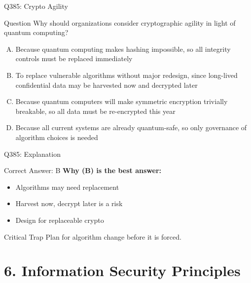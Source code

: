 \documentclass{beamer}
\begin{document}
	\begin{frame}{Q385: Crypto Agility}
		\begin{block}{Question}
			\small Why should organizations consider cryptographic agility in light of quantum computing?
		\end{block}
		\begin{enumerate}[(A)]
			\footnotesize
			\item Because quantum computing makes hashing impossible, so all integrity controls must be replaced immediately
			\item To replace vulnerable algorithms without major redesign, since long-lived confidential data may be harvested now and decrypted later
			\item Because quantum computers will make symmetric encryption trivially breakable, so all data must be re-encrypted this year
			\item Because all current systems are already quantum-safe, so only governance of algorithm choices is needed
		\end{enumerate}
	\end{frame}
	
	\begin{frame}{Q385: Explanation}
		\begin{block}{Correct Answer: B}
			\textbf{Why (B) is the best answer:}
			\begin{itemize}
				\item Algorithms may need replacement
				\item Harvest now, decrypt later is a risk
				\item Design for replaceable crypto
			\end{itemize}
		\end{block}
		\begin{alertblock}{Critical Trap}
			Plan for algorithm change before it is forced.
		\end{alertblock}
	\end{frame}
		
	\section{6. Information Security Principles}
	
\end{document}
